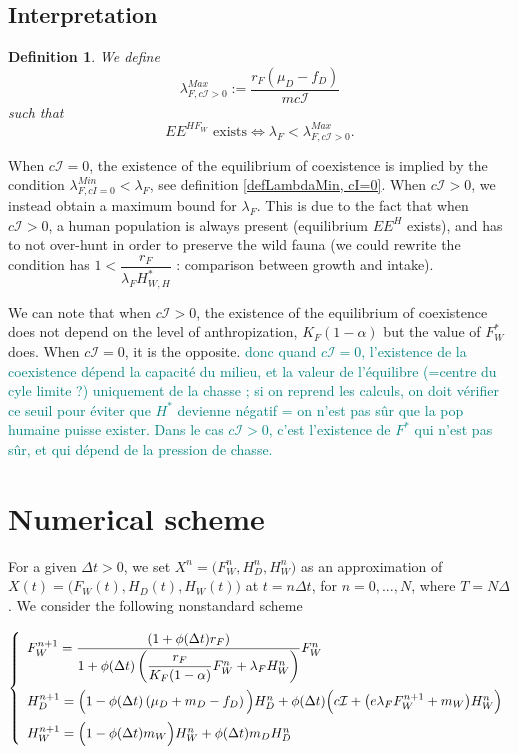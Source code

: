 \documentclass{article}
\newcommand{\lfw}{\lambda_{F}}
\newcommand{\lfw}{\lambda_{F}}
\newcommand{\cI}{c \mathcal{I}}
\newcommand{\marc}[1]{\textcolor{teal}{#1}}
\newtheorem{definition}{Definition}
\begin{document}
\subsection{Interpretation}

\begin{definition}
We define 
$$\lambda_{F, \cI>0}^{Max} := \dfrac{r_F(\mu_D - f_D)}{m c \mathcal{I}}$$
such that 
$$
\text{$EE^{HF_W}$ exists} \Leftrightarrow  \lfw < \lambda_{F, \cI>0}^{Max}.
$$
\end{definition}

When $\cI = 0$, the existence of the equilibrium of coexistence is implied by the condition $\lambda_{F, cI = 0}^{Min} < \lfw$, see definition \ref{defLambdaMin, cI=0}. When $\cI > 0$, we instead obtain a maximum bound for $\lfw$. This is due to the fact that when $\cI > 0$, a human population is always present (equilibrium $EE^{H}$ exists), and has to not over-hunt in order to preserve the wild fauna (we could rewrite the condition has $1 < \dfrac{r_F}{\lfw H^*_{W, H}}$ : comparison between growth and intake).


We can note that when $\cI > 0$, the existence of the equilibrium of coexistence does not depend on the level of anthropization, $K_F(1-\alpha)$ but the value of $F^*_W$ does. When $\cI = 0$, it is the opposite. 
\marc{donc quand $\cI =0$, l'existence de la coexistence dépend la capacité du milieu, et la valeur de l'équilibre (=centre du cyle limite ?) uniquement de la chasse ; si on reprend les calculs, on doit vérifier ce seuil pour éviter que $H^*$ devienne négatif = on n'est pas sûr que la pop humaine puisse exister. Dans le cas $\cI > 0$, c'est l'existence de $F^*$ qui n'est pas sûr, et qui dépend de la pression de chasse.}

\section{Numerical scheme}
For a given $\Delta t>0$, we set $X^n=\Big(F_W^n,H_D^n,H_W^n \Big)$ as an approximation of $X(t)=\Big(F_W(t),H_D(t),H_W(t)\Big)$ at $t=n\Delta t$, for $n=0,...,N$, where $T=N\Delta$. We consider the following nonstandard scheme

\begin{equation}
\def\arraystretch{2}
\left\{ \begin{array}{l}
F_{W}^{n+1}=\dfrac{\left(1+\phi(\Delta t)r_{F}\right)}{1+\phi(\Delta t)\left(\dfrac{r_{F}}{K_{F}(1-\alpha)}F_{W}^{n}+\lambda_{F}H_{W}^{n}\right)}F_{W}^{n}\\ 
H_{D}^{n+1}=\Big(1-\phi(\Delta t) \left(\mu_{D}+m_{D}-f_{D}\right)\Big)H_{D}^{n}+ \phi(\Delta t)\Big(c\mathcal{I}+ \big(e\lambda_{F}F_{W}^{n+1} + m_{W}\big)H_{W}^{n}\Big)\\ 
H_{W}^{n+1}=\Big(1-\phi(\Delta t)m_{W}\Big)H_{W}^n+\phi(\Delta t)m_{D}H_{D}^n
\end{array}\right.
\end{equation}
\end{document}

